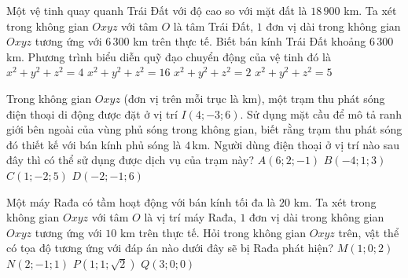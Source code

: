 \begin{ex}%
	Một vệ tinh quay quanh Trái  Đất với độ cao so với mặt đất là $18\,900$ km. Ta xét trong không gian $Oxyz$ với tâm $O$ là tâm Trái Đất, $1$ đơn vị dài trong không gian $Oxyz$ tương ứng với $6\,300$ km trên thực tế. Biết bán kính Trái Đất khoảng $6\,300$ km. Phương trình biểu diễn quỹ đạo chuyển động của vệ tinh đó là
	\choice 
		{$x^2+y^2+z^2=4$} 
		 {\True $x^2+y^2+z^2=16$}
		{$x^2+y^2+z^2=2$} 
		{$x^2+y^2+z^2=5$} 
\end{ex}

\begin{ex}%
	Trong không gian $Oxyz$ (đơn vị trên mỗi trục là km), một trạm  thu phát sóng điện thoại di động được đặt ở vị trí $I(4; -3; 6)$. Sử dụng mặt cầu để mô tả ranh giới bên ngoài của vùng phủ sóng trong không gian, biết rằng trạm thu phát sóng đó thiết kế với bán kính phủ sóng là $4$\,km. Người dùng điện thoại ở vị trí nào sau đây thì có thể sử dụng được dịch vụ của trạm này?
	 \choice
		{$A(6;2;-1)$} 
		 {$B(-4;1;3)$}
		 {\True $C(1;-2;5)$}
		 {$D(-2;-1;6)$}
\end{ex}

\begin{ex}%
	Một máy Rađa có tầm hoạt động với bán kính tối đa là $20$ km. Ta xét trong không gian $Oxyz$ với tâm $O$ là  vị trí máy Rađa, $1$ đơn vị dài trong không gian $Oxyz$ tương ứng với
	$10$ km trên thực tế. Hỏi trong không gian $Oxyz$ trên, vật thể có tọa độ tương ứng với đáp án nào dưới đây sẽ  bị Rađa phát hiện?
	 \choice
		{\True $M(1; 0; 2)$} 
		{$N(2;-1;  1)$}
		 {$P(1; 1; \sqrt{2})$}
		{$Q(3;  0; 0)$}
\end{ex}

